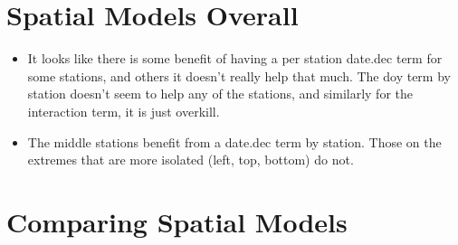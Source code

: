 \documentclass[12pt]{amsart}
\begin{document}
\section{Spatial Models Overall}
\begin{itemize}
\item It looks like there is some benefit of having a per station date.dec term for some stations, and others it doesn't really help that much. The doy term by station doesn't seem to help any of the stations, and similarly for the interaction term, it is just overkill.
\item The middle stations benefit from a date.dec term by station. Those on the extremes that are more isolated (left,  top, bottom) do not.
\end{itemize}

\section{Comparing Spatial Models}
\end{document}
